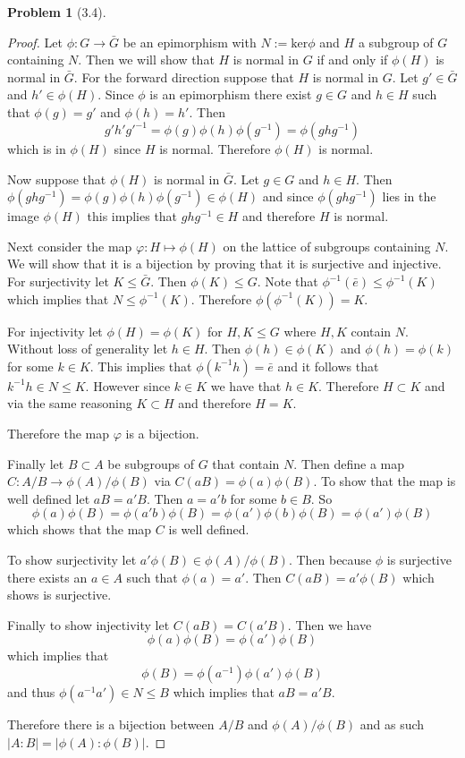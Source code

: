 \documentclass[10pt]{article}
\newcommand{\sk}{\vskip 10mm}
\theoremstyle{plain}
\newtheorem{problem}{Problem}
\theoremstyle{remark}
\begin{document}
\sk

\begin{problem}[3.4] %
  
\end{problem}

\begin{proof}
  Let $\phi:G\rightarrow \bar{G}$ be an epimorphism with $N:=\text{ker}\phi$ and $H$ a subgroup of $G$ containing $N$. Then
  we will show that $H$ is normal in $G$ if and only if $\phi(H)$ is normal in $\bar{G}$. For the forward
  direction suppose that $H$ is normal in $G$. Let $g'\in \bar{G}$ and $h'\in \phi(H)$. Since $\phi$ is an epimorphism
  there exist $g\in G$ and $h\in H$ such that $\phi(g)=g'$ and $\phi(h)=h'$. Then
  \[ g'h'g'^{-1}=\phi(g)\phi(h)\phi(g^{-1})=\phi(ghg^{-1})\]
  which is in $\phi(H)$ since $H$ is normal. Therefore $\phi(H)$ is normal.

  Now suppose that $\phi(H)$ is normal in $\bar{G}$. Let $g\in G$ and $h\in H$. Then
  $\phi(ghg^{-1})=\phi(g)\phi(h)\phi(g^{-1})\in\phi(H)$ and since $\phi(ghg^{-1})$ lies in the image $\phi(H)$ this implies
  that $ghg^{-1}\in H$ and therefore $H$ is normal.

  Next consider the map $\varphi:H\mapsto \phi(H)$ on the lattice of subgroups containing $N$.
  We will show that it is a bijection by proving that it is surjective and
  injective. For surjectivity let $K\leq \bar{G}$. Then $\phi(K)\leq G$. Note that
  $\phi^{-1}(\bar{e})\leq\phi^{-1}(K)$ which implies that $N\leq\phi^{-1}(K)$. Therefore $\phi(\phi^{-1}(K))=K$.

  For injectivity let $\phi(H)=\phi(K)$ for $H,K\leq G$ where $H,K$ contain $N$. Without loss of generality let
  $h\in H$. Then $\phi(h)\in\phi(K)$ and $\phi(h)=\phi(k)$ for some $k\in K$. This implies that $\phi(k^{-1}h)=\bar{e}$ and
  it follows that $k^{-1}h\in N\leq K$. However since $k\in K$ we have that $h\in K$. Therefore $H\subset K$ and via the
  same reasoning $K\subset H$ and therefore $H=K$.

  Therefore the map $\varphi$ is a bijection.

  Finally let $B\subset A$ be subgroups of $G$ that contain $N$. Then define a map $C:A/B\rightarrow \phi(A)/\phi(B)$
  via $C(aB)=\phi(a)\phi(B)$. To show that the map is well defined let $aB=a'B$. Then $a=a'b$ for some $b\in B$.
  So
  \[ \phi(a)\phi(B)=\phi(a'b)\phi(B)=\phi(a')\phi(b)\phi(B)=\phi(a')\phi(B)\]
  which shows that the map $C$ is well defined.

  To show surjectivity let $a'\phi(B)\in \phi(A)/\phi(B)$. Then because $\phi$ is surjective there exists an $a\in A$ such that
  $\phi(a)=a'$. Then $C(aB)=a'\phi(B)$ which shows is surjective.

  Finally to show injectivity let $C(aB)=C(a'B)$. Then we have
  \[ \phi(a)\phi(B)=\phi(a')\phi(B)\]
  which implies that
  \[ \phi(B)=\phi(a^{-1})\phi(a')\phi(B)\]
  and thus $\phi(a^{-1}a')\in N\leq B$ which implies that $aB=a'B$.

  Therefore there is a bijection between $A/B$ and $\phi(A)/\phi(B)$ and as such $|A:B|=|\phi(A):\phi(B)|$.
\end{proof}
\end{document}
